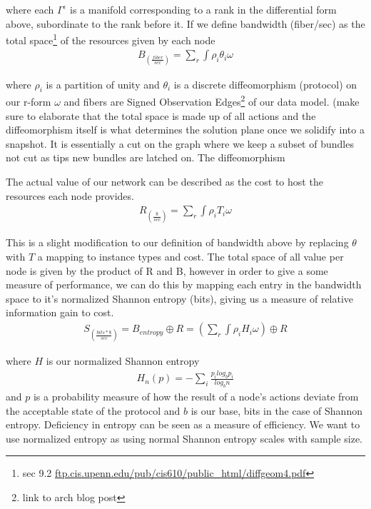 \documentclass{article}
\begin{document}
where each $\Gamma^{\epsilon}$ is a manifold corresponding to a rank in the differential form above, subordinate to the rank before it. If we define bandwidth (fiber/sec) as the total space\footnote{sec 9.2 \url{ftp.cis.upenn.edu/pub/cis610/public_html/diffgeom4.pdf}} of the resources given by each node
\begin{equation*} \label{eq1}
\begin{split}
B_{(\frac{fiber}{sec})} = \sum_{r} \int \rho_i \theta_i \omega
\end{split}
\end{equation*}

where $\rho_i$ is a partition of unity and $\theta_i$ is a discrete diffeomorphism (protocol) on our r-form $\omega$ and fibers are Signed Observation Edges\footnote{link to arch blog post} of our data model. (make sure to elaborate that the total space is made up of all actions and the diffeomorphism itself is what determines the solution plane once we solidify into a snapshot. It is essentially a cut on the graph where we keep a subset of bundles not cut as tips new bundles are latched on. The diffeomorphism

The actual value of our network can be described as the cost to host the resources each node provides. 
\begin{equation*} \label{eq1}
\begin{split}
R_{(\frac{\$}{sec})} = \sum_{r} \int \rho_i T_i \omega
\end{split}
\end{equation*}

This is a slight modification to our definition of bandwidth above by replacing $\theta$ with $T$ a mapping to instance types and cost. The total space of all value per node is given by the product of R and B, however in order to give a some measure of performance, we can do this by mapping each entry in the bandwidth space to it's normalized Shannon entropy (bits), giving us a measure of relative information gain to cost.
\begin{equation*} \label{eq1}
\begin{split}
S_{(\frac{bits*\$}{sec})} = B_{entropy} \oplus R = (\sum_{r} \int \rho_i H_i \omega ) \oplus R
\end{split}
\end{equation*}

where $H$ is our normalized Shannon entropy
\begin{equation*} \label{eq1}
\begin{split}
H_n(p) = - \sum_i \frac{p_i log_b p_i}{log_b n}
\end{split}
\end{equation*}
and $p$ is a probability measure of how the result of a node's actions deviate from the acceptable state of the protocol and $b$ is our base, bits in the case of Shannon entropy. Deficiency in entropy can be seen as a measure of efficiency. We want to use normalized entropy as using normal Shannon entropy scales with sample size.




\end{document}
